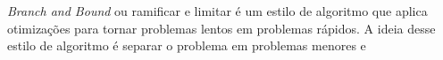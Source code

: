 \emph{Branch and Bound} ou ramificar e limitar é um estilo de algoritmo
que aplica otimizações para tornar problemas lentos em problemas rápidos.
A ideia desse estilo de algoritmo é separar o problema em problemas menores
e 